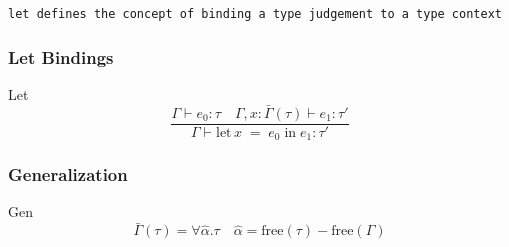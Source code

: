 \documentclass{beamer}
\begin{document}
\begin{frame}
  \tt{let} defines the concept of binding a type judgement to a type context
  \frametitle{Let Bindings}
  \begin{exampleblock}{Let}
    \[
      \frac{\Gamma \vdash e_0 : \tau \quad \Gamma, x : \bar{\Gamma}(\tau) \vdash e_1 : \tau'}
      {\Gamma \vdash \text{let}\, x\; =\; e_0\; \text{in}\; e_1 : \tau'}
    \]
  \end{exampleblock}
\end{frame}

\begin{frame}
  \frametitle{Generalization}
  \begin{exampleblock}{Gen}
    \[
      \bar{\Gamma}(\tau) = \forall \hat{\alpha} . \tau \quad \hat{\alpha} = \text{free}(\tau) - \text{free}(\Gamma)
    \]
  \end{exampleblock}
\end{frame}
\end{document}
